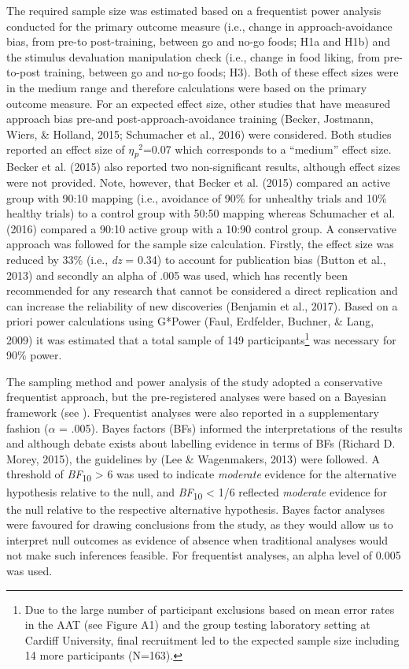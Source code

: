 \documentclass[man,floatsintext]{apa6}
\let\rmarkdownfootnote\footnote%
\def\footnote{\protect\rmarkdownfootnote}
\begin{document}
The required sample size was estimated based on a frequentist power analysis conducted for the primary outcome measure (i.e., change in approach-avoidance bias, from pre-to post-training, between go and no-go foods; H1a and H1b) and the stimulus devaluation manipulation check (i.e., change in food liking, from pre-to-post training, between go and no-go foods; H3). Both of these effect sizes were in the medium range and therefore calculations were based on the primary outcome measure. For an expected effect size, other studies that have measured approach bias pre-and post-approach-avoidance training (Becker, Jostmann, Wiers, \& Holland, 2015; Schumacher et al., 2016) were considered. Both studies reported an effect size of \textit{$\eta$\textsubscript{p}$^{2}$}=0.07 which corresponds to a \enquote{medium} effect size. Becker et al. (2015) also reported two non-significant results, although effect sizes were not provided. Note, however, that Becker et al. (2015) compared an active group with 90:10 mapping (i.e., avoidance of 90\% for unhealthy trials and 10\% healthy trials) to a control group with 50:50 mapping whereas Schumacher et al. (2016) compared a 90:10 active group with a 10:90 control group. A conservative approach was followed for the sample size calculation. Firstly, the effect size was reduced by 33\% (i.e., \emph{dz} = 0.34) to account for publication bias (Button et al., 2013) and secondly an alpha of .005 was used, which has recently been recommended for any research that cannot be considered a direct replication and can increase the reliability of new discoveries (Benjamin et al., 2017). Based on a priori power calculations using G*Power (Faul, Erdfelder, Buchner, \& Lang, 2009) it was estimated that a total sample of 149 participants\footnote{Due to the large number of participant exclusions based on mean error rates in the AAT (see Figure A1) and the group testing laboratory setting at Cardiff University, final recruitment led to the expected sample size including 14 more participants (N=163).} was necessary for 90\% power.

\par

The sampling method and power analysis of the study adopted a conservative frequentist approach, but the pre-registered analyses were based on a Bayesian framework (see \textit{}). Frequentist analyses were also reported in a supplementary fashion (\(\alpha\) = .005). Bayes factors (BFs) informed the interpretations of the results and although debate exists about labelling evidence in terms of BFs (Richard D. Morey, 2015), the guidelines by (Lee \& Wagenmakers, 2013) were followed. A threshold of \emph{BF}\textsubscript{10} \textgreater{} 6 was used to indicate \emph{moderate} evidence for the alternative hypothesis relative to the null, and \emph{BF}\textsubscript{10} \textless{} 1/6 reflected \emph{moderate} evidence for the null relative to the respective alternative hypothesis. Bayes factor analyses were favoured for drawing conclusions from the study, as they would allow us to interpret null outcomes as evidence of absence when traditional analyses would not make such inferences feasible. For frequentist analyses, an alpha level of 0.005 was used.
\end{document}
